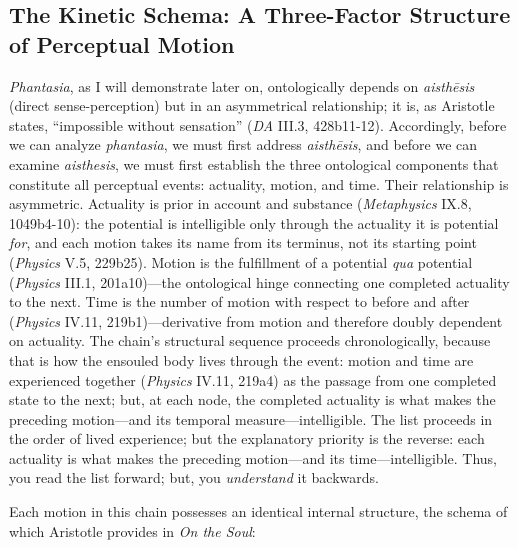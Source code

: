 \documentclass{article}
\begin{document}
\subsection{The Kinetic Schema: A Three-Factor Structure of Perceptual Motion}

\textit{Phantasia}, as I will demonstrate later on, ontologically depends on \textit{aisthēsis} (direct sense-perception) but in an asymmetrical relationship; it is, as Aristotle states, ``impossible without sensation'' (\textit{DA} III.3, 428b11-12). Accordingly, before we can analyze \textit{phantasia}, we must first address \textit{aisthēsis}, and before we can examine \textit{aisthesis}, we must first establish the three ontological components that constitute all perceptual events: actuality, motion, and time. Their relationship is asymmetric. Actuality is prior in account and substance (\textit{Metaphysics} IX.8,  1049b4-10): the potential is intelligible only through the actuality it is potential \textit{for}, and each motion takes its name from its terminus, not its starting point (\textit{Physics} V.5, 229b25). Motion is the fulfillment of a potential \textit{qua} potential (\textit{Physics} III.1, 201a10)---the ontological hinge connecting one completed actuality to the next. Time is the number of motion with respect to before and after (\textit{Physics} IV.11, 219b1)---derivative from motion and therefore doubly dependent on actuality. The chain's structural sequence proceeds chronologically, because that is how the ensouled body lives through the event: motion and time are experienced together (\textit{Physics} IV.11, 219a4) as the passage from one completed state to the next; but, at each node, the completed actuality is what makes the preceding motion---and its temporal measure---intelligible. The list proceeds in the order of lived experience; but the explanatory priority is the reverse: each actuality is what makes the preceding motion---and its time---intelligible. Thus, you read the list forward; but, you \textit{understand} it backwards. 

Each motion in this chain possesses an identical internal structure, the schema of which Aristotle provides in \textit{On the Soul}: 
\end{document}
